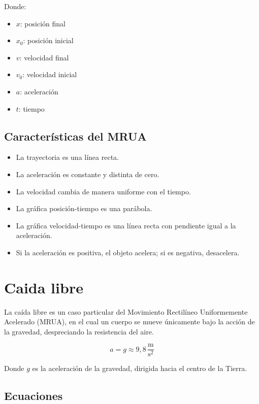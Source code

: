 Donde:
\begin{itemize}
    \setlength{\itemsep}{0pt}
    \item $x$: posición final
    \item $x_0$: posición inicial
    \item $v$: velocidad final
    \item $v_0$: velocidad inicial
    \item $a$: aceleración
    \item $t$: tiempo
\end{itemize}

\subsection{Características del MRUA}

\begin{itemize}
    \setlength{\itemsep}{0pt}
    \item La trayectoria es una línea recta.
    \item La aceleración es constante y distinta de cero.
    \item La velocidad cambia de manera uniforme con el tiempo.
    \item La gráfica posición-tiempo es una parábola.
    \item La gráfica velocidad-tiempo es una línea recta con pendiente igual a la aceleración.
    \item Si la aceleración es positiva, el objeto acelera; si es negativa, desacelera.
\end{itemize}


\section{Caida libre}

La caída libre es un caso particular del Movimiento Rectilíneo Uniformemente Acelerado (MRUA), en el cual un cuerpo se mueve únicamente bajo la acción de la gravedad, despreciando la resistencia del aire.

\vspace{-20pt}

\[
a = g \approx 9{,}8 \,\frac{\text{m}}{\text{s}^2}
\]

Donde $g$ es la aceleración de la gravedad, dirigida hacia el centro de la Tierra.


\subsection{Ecuaciones}

